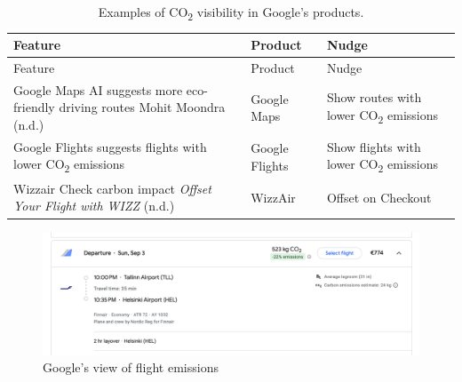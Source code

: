\documentclass[
  letterpaper,
  DIV=11,
  numbers=noendperiod]{scrartcl}
\begin{document}
\begin{longtable}[]{@{}
  >{\raggedright\arraybackslash}p{}
  >{\raggedright\arraybackslash}p{}
  >{\raggedright\arraybackslash}p{}@{}}
\caption{Examples of CO\textsubscript{2} visibility in Google's
products.}\tabularnewline
\toprule\noalign{}
\begin{minipage}[b]{\linewidth}\raggedright
Feature
\end{minipage} & \begin{minipage}[b]{\linewidth}\raggedright
Product
\end{minipage} & \begin{minipage}[b]{\linewidth}\raggedright
Nudge
\end{minipage} \\
\midrule\noalign{}
\endfirsthead
\toprule\noalign{}
\begin{minipage}[b]{\linewidth}\raggedright
Feature
\end{minipage} & \begin{minipage}[b]{\linewidth}\raggedright
Product
\end{minipage} & \begin{minipage}[b]{\linewidth}\raggedright
Nudge
\end{minipage} \\
\midrule\noalign{}
\endhead
\bottomrule\noalign{}
\endlastfoot
Google Maps AI suggests more eco-friendly driving routes Mohit Moondra
(n.d.) & Google Maps & Show routes with lower CO\textsubscript{2}
emissions \\
Google Flights suggests flights with lower CO\textsubscript{2} emissions
& Google Flights & Show flights with lower CO\textsubscript{2}
emissions \\
Wizzair Check carbon impact \emph{Offset Your Flight with {WIZZ}} (n.d.)
& WizzAir & Offset on Checkout \\
\end{longtable}

\begin{figure}[H]

{\centering \includegraphics[width=1\linewidth,height=\textheight,keepaspectratio]{./images/design/flight-emissions.png}

}

\caption{Google's view of flight emissions}

\end{figure}%
\end{document}
